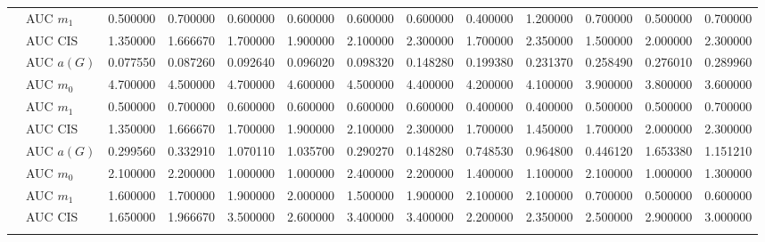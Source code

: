\begin{table}[htbp]
\begin{tabular}{llrrrrrrrrrrr}
    & AUC $m_1$ & 0.500000 & 0.700000 & 0.600000 & 0.600000 & 0.600000 & 0.600000 & 0.400000 & 1.200000 & 0.700000 & 0.500000 & 0.700000 \\
    & AUC CIS & 1.350000 & 1.666670 & 1.700000 & 1.900000 & 2.100000 & 2.300000 & 1.700000 & 2.350000 & 1.500000 & 2.000000 & 2.300000 \\
    \addlinespace
    \multirow{4}{*}{degree} & AUC $a(G)$ & 0.077550 & 0.087260 & 0.092640 & 0.096020 & 0.098320 & 0.148280 & 0.199380 & 0.231370 & 0.258490 & 0.276010 & 0.289960 \\
    & AUC $m_0$ & 4.700000 & 4.500000 & 4.700000 & 4.600000 & 4.500000 & 4.400000 & 4.200000 & 4.100000 & 3.900000 & 3.800000 & 3.600000 \\
    & AUC $m_1$ & 0.500000 & 0.700000 & 0.600000 & 0.600000 & 0.600000 & 0.600000 & 0.400000 & 0.400000 & 0.500000 & 0.500000 & 0.700000 \\
    & AUC CIS & 1.350000 & 1.666670 & 1.700000 & 1.900000 & 2.100000 & 2.300000 & 1.700000 & 1.450000 & 1.700000 & 2.000000 & 2.300000 \\
    \addlinespace
    \multirow{4}{*}{random} & AUC $a(G)$ & 0.299560 & 0.332910 & 1.070110 & 1.035700 & 0.290270 & 0.148280 & 0.748530 & 0.964800 & 0.446120 & 1.653380 & 1.151210 \\
    & AUC $m_0$ & 2.100000 & 2.200000 & 1.000000 & 1.000000 & 2.400000 & 2.200000 & 1.400000 & 1.100000 & 2.100000 & 1.000000 & 1.300000 \\
    & AUC $m_1$ & 1.600000 & 1.700000 & 1.900000 & 2.000000 & 1.500000 & 1.900000 & 2.100000 & 2.100000 & 0.700000 & 0.500000 & 0.600000 \\
    & AUC CIS & 1.650000 & 1.966670 & 3.500000 & 2.600000 & 3.400000 & 3.400000 & 2.200000 & 2.350000 & 2.500000 & 2.900000 & 3.000000 \\
    \addlinespace
    \bottomrule
  \end{tabular}
\end{table}

